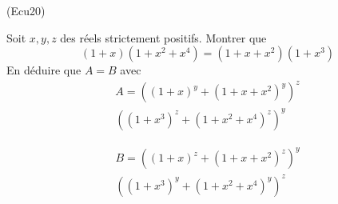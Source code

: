 \begin{tiny}(Ecu20)\end{tiny} Soit $x, y, z$ des réels strictement positifs.\newline
Montrer que
\begin{displaymath}
  (1+x)(1+x^2+x^4) = (1+x+x^2)(1+x^3)
\end{displaymath}
En déduire que $A=B$ avec
\begin{multline*}
A =\left( (1+x)^y + (1+x+x^2)^y\right)^z \\ \left( (1+x^3)^z + (1+x^2+x^4)^z \right)^y
\end{multline*}

\begin{multline*}
B = \left( (1+x)^z + (1+x+x^2)^z\right)^y \\ \left( (1+x^3)^y + (1+x^2+x^4)^y \right)^z  
\end{multline*}

